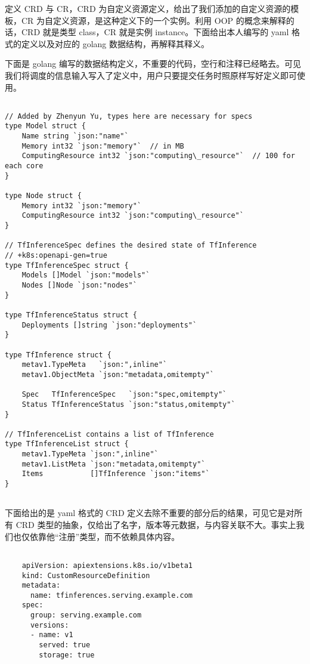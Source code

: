 定义 CRD 与 CR，CRD 为自定义资源定义，给出了我们添加的自定义资源的模板，CR 为自定义资源，是这种定义下的一个实例。利用 OOP 的概念来解释的话，CRD 就是类型 class，CR 就是实例 instance。下面给出本人编写的 yaml 格式的定义以及对应的 golang 数据结构，再解释其释义。

下面是 golang 编写的数据结构定义，不重要的代码，空行和注释已经略去。可见我们将调度的信息输入写入了定义中，用户只要提交任务时照原样写好定义即可使用。

\begin{lstlisting}

// Added by Zhenyun Yu, types here are necessary for specs
type Model struct {
    Name string `json:"name"`
    Memory int32 `json:"memory"`  // in MB
    ComputingResource int32 `json:"computing\_resource"`  // 100 for each core
}

type Node struct {
    Memory int32 `json:"memory"`
    ComputingResource int32 `json:"computing\_resource"`
}

// TfInferenceSpec defines the desired state of TfInference
// +k8s:openapi-gen=true
type TfInferenceSpec struct {
    Models []Model `json:"models"`
    Nodes []Node `json:"nodes"`
}

type TfInferenceStatus struct {
    Deployments []string `json:"deployments"`
}

type TfInference struct {
    metav1.TypeMeta   `json:",inline"`
    metav1.ObjectMeta `json:"metadata,omitempty"`

    Spec   TfInferenceSpec   `json:"spec,omitempty"`
    Status TfInferenceStatus `json:"status,omitempty"`
}

// TfInferenceList contains a list of TfInference
type TfInferenceList struct {
    metav1.TypeMeta `json:",inline"`
    metav1.ListMeta `json:"metadata,omitempty"`
    Items           []TfInference `json:"items"`
}
    
\end{lstlisting}

下面给出的是 yaml 格式的 CRD 定义去除不重要的部分后的结果，可见它是对所有 CRD 类型的抽象，仅给出了名字，版本等元数据，与内容关联不大。事实上我们也仅依靠他“注册”类型，而不依赖具体内容。

\begin{lstlisting}

    apiVersion: apiextensions.k8s.io/v1beta1
    kind: CustomResourceDefinition
    metadata:
      name: tfinferences.serving.example.com
    spec:
      group: serving.example.com
      versions:
      - name: v1
        served: true
        storage: true

\end{lstlisting}

